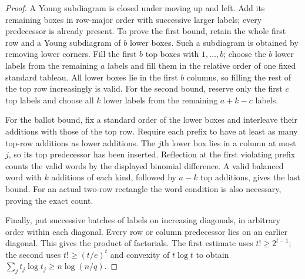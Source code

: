 \begin{proof}
A Young subdiagram is closed under moving up and left.  Add its
remaining boxes in row-major order with successive larger labels;
every predecessor is already present.  To prove the first bound,
retain the whole first row and a Young subdiagram of $b$ lower boxes.
Such a subdiagram is obtained by removing lower corners.  Fill the
first $b$ top boxes with $1,\ldots,b$; choose the $b$ lower labels
from the remaining $a$ labels and fill them in the relative order of
one fixed standard tableau.  All lower boxes lie in the first $b$
columns, so filling the rest of the top row increasingly is valid.
For the second bound, reserve only the first $c$ top labels and
choose all $k$ lower labels from the remaining $a+k-c$ labels.

For the ballot bound, fix a standard order of the lower boxes and
interleave their additions with those of the top row.  Require each
prefix to have at least as many top-row additions as lower additions.
The $j$th lower box lies in a column at most $j$, so its top predecessor
has been inserted.  Reflection at the first violating prefix counts
the valid words by the displayed binomial difference.  A valid
balanced word with $k$ additions of each kind, followed by $a-k$
top additions, gives the last bound.  For an actual two-row rectangle
the word condition is also necessary, proving the exact count.

Finally, put successive batches of labels on increasing diagonals,
in arbitrary order within each diagonal.  Every row or column
predecessor lies on an earlier diagonal.  This gives the product of
factorials.  The first estimate uses $t!\ge2^{t-1}$; the second uses
$t!\ge(t/e)^t$ and convexity of $t\log t$ to obtain
$\sum_jt_j\log t_j\ge n\log(n/q)$.
\end{proof}

